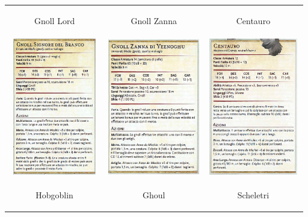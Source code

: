         \newpage   
        \begin{tabular}{|c|c|c|}
            \hline
            \hypertarget{gnoll}{Gnoll Lord}&  \hypertarget{gnoll}{Gnoll Zanna} & \hypertarget{Centauro}{Centauro} \\
            \includegraphics[width=4cm,height = 6cm]{../Mostri/Gnoll_lord.png}& \includegraphics[width=4cm,height = 6cm]{../Mostri/Gnoll_Zanna.png}&\includegraphics[width=4cm,height = 6cm]{../Mostri/Centauro.png}\\
            \hline
            \hypertarget{hobgoblin}{Hobgoblin}& \hypertarget{hobgoblin}{Ghoul} &\hypertarget{hobgoblin}{Scheletri}\\

\end{tabular}
